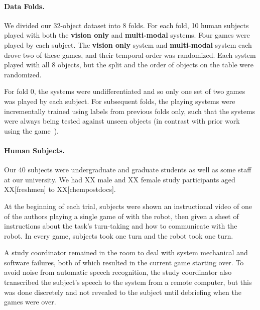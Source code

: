 \paragraph{Data Folds.}
We divided our 32-object dataset into 8 folds.
For each fold, 10 human subjects played \ispy with both the \textbf{vision only} and \textbf{multi-modal} systems.
Four games were played by each subject.
The \textbf{vision only} system and \textbf{multi-modal} system each drove two of these games, and their temporal order was randomized.
Each system played with all 8 objects, but the split and the order of objects on the table were randomized.

For fold 0, the systems were undifferentiated and so only one set of two games was played by each subject.
For subsequent folds, the \ispy playing systems were incrementally trained using labels from previous folds only, such that the systems were always being tested against unseen objects (in contrast with prior work using the \ispy game~\cite{parde:ijcai15}).

\paragraph{Human Subjects.}
Our 40 subjects were undergraduate and graduate students as well as some staff at our university.
We had XX male and XX female study participants aged XX[freshmen] to XX[chempostdocs].

At the beginning of each trial, subjects were shown an instructional video of one of the authors playing a single game of \ispy with the robot, then given a sheet of instructions about the task's turn-taking and how to communicate with the robot.
In every game, subjects took one turn and the robot took one turn.

A study coordinator remained in the room to deal with system mechanical and software failures, both of which resulted in the current game starting over.
To avoid noise from automatic speech recognition, the study coordinator also transcribed the subject's speech to the system from a remote computer, but this was done discretely and not revealed to the subject until debriefing when the games were over.